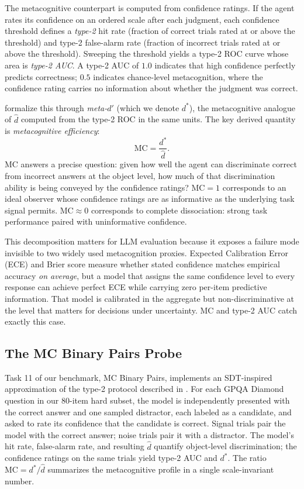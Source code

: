 The metacognitive counterpart is computed from confidence ratings. If the agent rates its confidence on an ordered scale after each judgment, each confidence threshold defines a \emph{type-2} hit rate (fraction of correct trials rated at or above the threshold) and type-2 false-alarm rate (fraction of incorrect trials rated at or above the threshold). Sweeping the threshold yields a type-2 ROC curve whose area is \emph{type-2 AUC}. A type-2 AUC of $1.0$ indicates that high confidence perfectly predicts correctness; $0.5$ indicates chance-level metacognition, where the confidence rating carries no information about whether the judgment was correct.

\citet{maniscalco2012} formalize this through \emph{meta-$d'$} (which we denote $d^{*}$), the metacognitive analogue of $\hat{d}$ computed from the type-2 ROC in the same units. The key derived quantity is \emph{metacognitive efficiency}:
\begin{equation}
\mathrm{MC} = \frac{d^{*}}{\hat{d}}.
\end{equation}
$\mathrm{MC}$ answers a precise question: given how well the agent can discriminate correct from incorrect answers at the object level, how much of that discrimination ability is being conveyed by the confidence ratings? $\mathrm{MC} = 1$ corresponds to an ideal observer whose confidence ratings are as informative as the underlying task signal permits. $\mathrm{MC} \approx 0$ corresponds to complete dissociation: strong task performance paired with uninformative confidence.

This decomposition matters for LLM evaluation because it exposes a failure mode invisible to two widely used metacognition proxies. Expected Calibration Error (ECE) and Brier score measure whether stated confidence matches empirical accuracy \emph{on average}, but a model that assigns the same confidence level to every response can achieve perfect ECE while carrying zero per-item predictive information. That model is calibrated in the aggregate but non-discriminative at the level that matters for decisions under uncertainty. $\mathrm{MC}$ and type-2 AUC catch exactly this case.

\subsection{The MC Binary Pairs Probe}
\label{sec:mc-binary-pairs}

Task 11 of our benchmark, MC Binary Pairs, implements an SDT-inspired approximation of the type-2 protocol described in \citet{wang2025metasdt}. For each GPQA Diamond question \citep{rein2023gpqa} in our 80-item hard subset, the model is independently presented with the correct answer and one sampled distractor, each labeled as a candidate, and asked to rate its confidence that the candidate is correct. Signal trials pair the model with the correct answer; noise trials pair it with a distractor. The model's hit rate, false-alarm rate, and resulting $\hat{d}$ quantify object-level discrimination; the confidence ratings on the same trials yield type-2 AUC and $d^{*}$. The ratio $\mathrm{MC} = d^{*}/\hat{d}$ summarizes the metacognitive profile in a single scale-invariant number.

